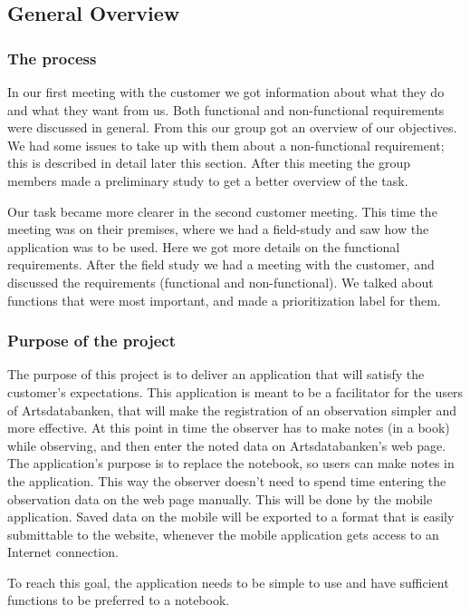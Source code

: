 \subsection{General Overview}

\subsubsection{ The process}
In our first meeting with the customer we got information about what they do and what they want from us.
Both functional and non-functional requirements were discussed in general.
From this our group got an overview of our objectives.
We had some issues to take up with them about a non-functional requirement; this is described in detail later this section.
After this meeting the group members made a preliminary study to get a better overview of the task.

Our task became more clearer in the second customer meeting.
This time the meeting was on their premises, where we had a field-study and saw how the
application was to be used. Here we got more details on the functional requirements.
After the field study we had a meeting with the customer, and discussed the requirements
(functional and non-functional). We talked about functions that were most important,
and made a prioritization label for them.

\subsubsection{Purpose of the project}

The purpose of this project is to deliver an application that will satisfy the customer's expectations.
This application is meant to be a facilitator for the users of Artsdatabanken,
that will make the registration of an observation simpler and more effective.
At this point in time the observer has to make notes (in a book) while observing,
and then enter the noted data on Artsdatabanken's web page.
The application's purpose is to replace the notebook, so users can make notes in the application.
This way the observer doesn't need to spend time entering the observation data on the web page manually.
This will be done by the mobile application. Saved data on the mobile will be exported to a format
that is easily submittable to the website, whenever the mobile application gets access to an Internet connection.

To reach this goal, the application needs to be simple to use and have sufficient functions to be preferred to a notebook.



